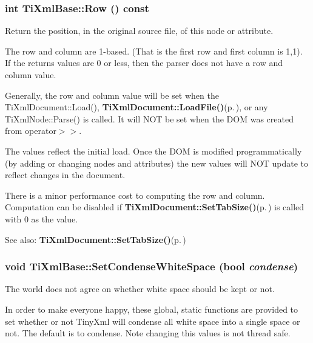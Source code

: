 \subsubsection{\setlength{\rightskip}{0pt plus 5cm}int Ti\-Xml\-Base::Row () const\hspace{0.3cm}{\tt  [inline, inherited]}}\label{classTiXmlBase_TiXmlUnknowna78}


Return the position, in the original source file, of this node or attribute. 

The row and column are 1-based. (That is the first row and first column is 1,1). If the returns values are 0 or less, then the parser does not have a row and column value.

Generally, the row and column value will be set when the Ti\-Xml\-Document::Load(), {\bf Ti\-Xml\-Document::Load\-File()}{\rm (p.\,\pageref{classTiXmlDocument_TiXmlDocumenta6})}, or any Ti\-Xml\-Node::Parse() is called. It will NOT be set when the DOM was created from operator$>$$>$.

The values reflect the initial load. Once the DOM is modified programmatically (by adding or changing nodes and attributes) the new values will NOT update to reflect changes in the document.

There is a minor performance cost to computing the row and column. Computation can be disabled if {\bf Ti\-Xml\-Document::Set\-Tab\-Size()}{\rm (p.\,\pageref{classTiXmlDocument_TiXmlDocumenta20})} is called with 0 as the value.

\begin{Desc}
\item[See also:]{\bf Ti\-Xml\-Document::Set\-Tab\-Size()}{\rm (p.\,\pageref{classTiXmlDocument_TiXmlDocumenta20})}\end{Desc}
\subsubsection{\setlength{\rightskip}{0pt plus 5cm}void Ti\-Xml\-Base::Set\-Condense\-White\-Space (bool {\em condense})\hspace{0.3cm}{\tt  [inline, static, inherited]}}\label{classTiXmlBase_TiXmlUnknowne0}


The world does not agree on whether white space should be kept or not. 

In order to make everyone happy, these global, static functions are provided to set whether or not Tiny\-Xml will condense all white space into a single space or not. The default is to condense. Note changing this values is not thread safe.

